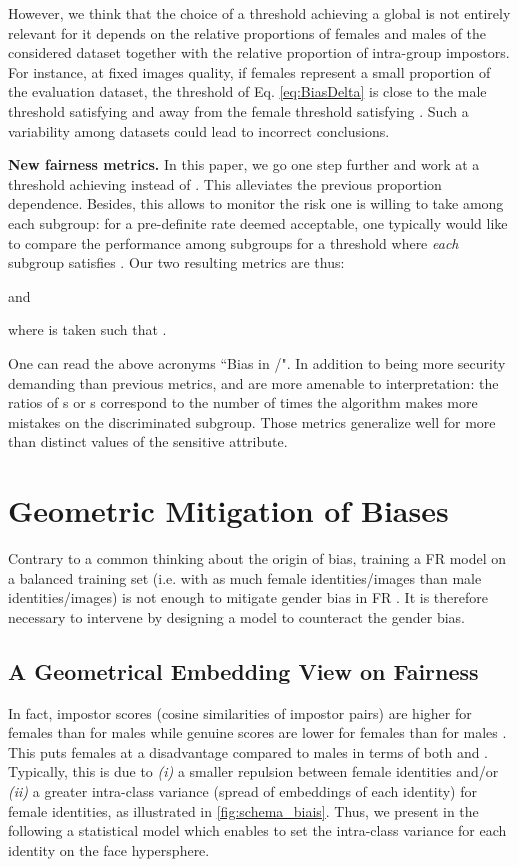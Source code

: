 \documentclass[nohyperref]{article}
\theoremstyle{plain}
\theoremstyle{definition}
\theoremstyle{remark}
\begin{document}
However, we think that the choice of a threshold achieving a global  is not entirely relevant for it depends on the relative proportions of females and males of the considered dataset together with the relative proportion of intra-group impostors. For instance, at fixed images quality, if females represent a small proportion of the evaluation dataset, the threshold  of Eq. \ref{eq:BiasDelta} is close to the male threshold  satisfying  and away from the female threshold  satisfying . Such a variability among datasets could lead to incorrect conclusions.

{\bf New fairness metrics. }In this paper, we go one step further and work at a threshold achieving  instead of . This alleviates the previous proportion dependence. Besides, this allows to monitor the risk one is willing to take among each subgroup: for a pre-definite rate  deemed acceptable, one typically would like to compare the performance among subgroups for a threshold where {\it each} subgroup satisfies . Our two resulting metrics are thus:

and
 
where  is taken such that .


One can read the above acronyms ``Bias in /". In addition to being more security demanding than previous metrics,  and  are more amenable to interpretation: the ratios of s or s correspond to the number of times the algorithm makes more mistakes on the discriminated subgroup. Those metrics generalize well for more than  distinct values of the sensitive attribute. 
\section{Geometric Mitigation of Biases}\label{sec:vMF for eth mod}

Contrary to a common thinking about the origin of bias, training a FR model on a balanced training set (i.e. with as much female identities/images than male identities/images) is not enough to mitigate gender bias in FR \cite{gender_balanced_data}. It is therefore necessary to intervene by designing a model to counteract the gender bias.



\subsection{A Geometrical Embedding View on Fairness}\label{subsec:geometrical_causes_bias}

In fact, impostor scores (cosine similarities of impostor pairs) are higher for females than for males while genuine scores are lower for females than for males \cite{nist_report_2019, too_bias_or_not}. This puts females at a disadvantage compared to males in terms of both  and . Typically, this is due to {\it(i)} a smaller repulsion between female identities and/or {\it(ii)} a greater intra-class variance (spread of embeddings of each identity) for female identities, as illustrated in \autoref{fig:schema_biais}. Thus, we present in the following a statistical model which enables to set the intra-class variance for each identity on the face hypersphere.
\end{document}
